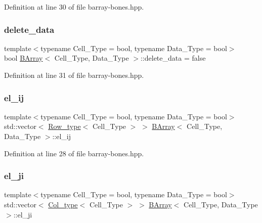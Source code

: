 Definition at line 30 of file barray-\/bones.\+hpp.

\mbox{\label{class_b_array_a1e932e3353905d77a2062560ee96b2fc}} 
\subsubsection{\texorpdfstring{delete\+\_\+data}{delete\_data}}
{\footnotesize\ttfamily template$<$typename Cell\+\_\+\+Type = bool, typename Data\+\_\+\+Type = bool$>$ \\
bool \hyperlink{class_b_array}{B\+Array}$<$ Cell\+\_\+\+Type, Data\+\_\+\+Type $>$\+::delete\+\_\+data = false}



Definition at line 31 of file barray-\/bones.\+hpp.

\mbox{\label{class_b_array_a2161dc7c2046a57d3e663ac5c0d70431}} 
\subsubsection{\texorpdfstring{el\+\_\+ij}{el\_ij}}
{\footnotesize\ttfamily template$<$typename Cell\+\_\+\+Type = bool, typename Data\+\_\+\+Type = bool$>$ \\
std\+::vector$<$ \hyperlink{typedefs_8hpp_a4deca4f3fb25a4da374818ab459b8b4a}{Row\+\_\+type}$<$ Cell\+\_\+\+Type $>$ $>$ \hyperlink{class_b_array}{B\+Array}$<$ Cell\+\_\+\+Type, Data\+\_\+\+Type $>$\+::el\+\_\+ij}



Definition at line 28 of file barray-\/bones.\+hpp.

\mbox{\label{class_b_array_aad8ce1aa5fddd3899164c1aa1dfede94}} 
\subsubsection{\texorpdfstring{el\+\_\+ji}{el\_ji}}
{\footnotesize\ttfamily template$<$typename Cell\+\_\+\+Type = bool, typename Data\+\_\+\+Type = bool$>$ \\
std\+::vector$<$ \hyperlink{typedefs_8hpp_a3bb95a7612ee928fba42f33a96adb3eb}{Col\+\_\+type}$<$ Cell\+\_\+\+Type $>$ $>$ \hyperlink{class_b_array}{B\+Array}$<$ Cell\+\_\+\+Type, Data\+\_\+\+Type $>$\+::el\+\_\+ji}



